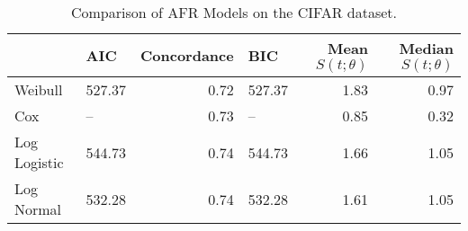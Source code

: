 \begin{table*}\n\centering
\caption{Comparison of AFR Models on the CIFAR dataset.}
\label{tab:cifar}
\begin{tabular}{llrlrr}
\toprule
 & AIC & Concordance & BIC & Mean $S(t;\theta)$ & Median $S(t; \theta)$ \\
\midrule
Weibull & 527.37 & 0.72 & 527.37 & 1.83 & 0.97 \\
Cox & -- & 0.73 & -- & 0.85 & 0.32 \\
Log Logistic & 544.73 & 0.74 & 544.73 & 1.66 & 1.05 \\
Log Normal & 532.28 & 0.74 & 532.28 & 1.61 & 1.05 \\
\bottomrule
\end{tabular}
\end{table*}
